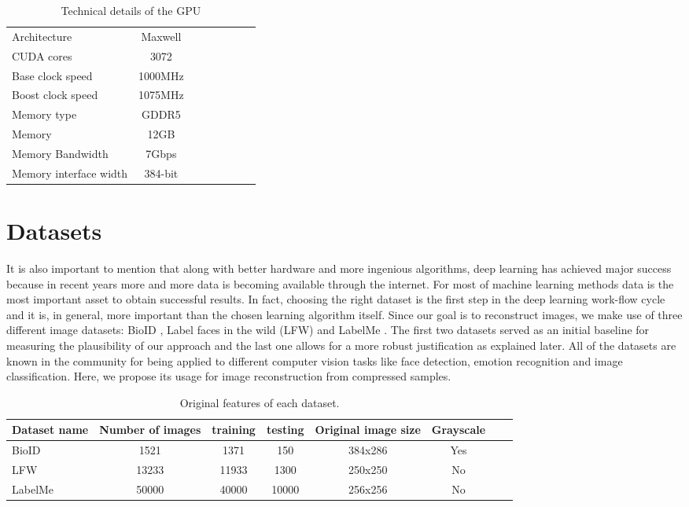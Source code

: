 \begin{table}[!htb]
\caption[Technical speficications of GeForce GTX Titan]{Technical details of the GPU}
\label{tab:GPU1}
\centering
\begin{tabular}{l*{6}{c}r}
\hline
Architecture   & Maxwell\\
CUDA cores   & 3072\\
Base clock speed   & 1000MHz\\
Boost clock speed   & 1075MHz\\
Memory type   & GDDR5\\
Memory    & 12GB\\
Memory Bandwidth    & 7Gbps\\
Memory interface width    & 384-bit\\
\bottomrule 
\end{tabular}  
\end{table}

\FloatBarrier

\section{Datasets}
It is also important to mention that along with better hardware and more ingenious algorithms, deep learning has achieved major success because in recent years more and more data is becoming available through the internet. For most of machine learning methods data is the most important asset to obtain successful results. In fact, choosing the right dataset is the first step in the deep learning work-flow cycle and it is, in general, more important than the chosen learning algorithm itself. 
\newline
Since our goal is to reconstruct images, we make use of three different image datasets: BioID \cite{frischholz2003bioid}, Label faces in the wild (LFW) \cite{LFWTech} and LabelMe \cite{russell2008labelme}. The first two datasets served as an initial baseline for measuring the plausibility of our approach and the last one allows for a more robust justification as explained later. All of the datasets are known in the community for being applied to different computer vision tasks like face detection, emotion recognition and image classification. Here, we propose its usage for image reconstruction from compressed samples.

\vspace{1cm}    
 
\begin{table}[!htb]
\caption[Datasets for training and testing]{Original features of each dataset.}
\label{tab:datasets1}
\centering
\begin{tabular}{l*{6}{c}r}
Dataset name              & Number of images & training & testing &  Original image size& Grayscale \\
\hline
BioID   & 1521 & 1371 & 150 & 384x286 & Yes\\
LFW     & 13233 & 11933 & 1300 & 250x250 & No\\
LabelMe & 50000 & 40000 & 10000 & 256x256 & No\\
\bottomrule 
\end{tabular}  
\end{table}

